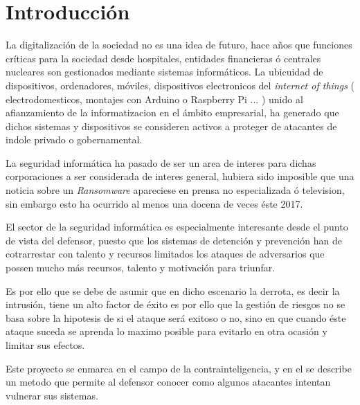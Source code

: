 
\chapter{Introducción}

La digitalización de la sociedad no es una idea de futuro, hace años que funciones críticas para la sociedad
desde hospitales, entidades financieras ó centrales nucleares son gestionados mediante sistemas informáticos. 
La ubicuidad de dispositivos, ordenadores, móviles, dispositivos electronicos del \emph{internet of things}
( electrodomesticos, montajes con Arduino o Raspberry Pi ... ) unido al afianzamiento de la informatizacion en el ámbito empresarial, ha generado
que dichos sistemas y dispositivos se consideren activos a proteger de atacantes de indole privado o gobernamental.

La seguridad informática ha pasado de ser un area de interes para dichas corporaciones a ser considerada de interes general,
hubiera sido imposible que una noticia sobre un \emph{Ransomware} apareciese en prensa no especializada ó television, sin embargo esto ha ocurrido
al menos una docena de veces éste 2017.

El sector de la seguridad informática es especialmente interesante desde el punto de vista del defensor, puesto que
los sistemas de detención y prevención han de cotrarrestar con talento y recursos limitados los ataques de adversarios
que possen mucho más recursos, talento y motivación para triunfar.

Es por ello que se debe de asumir que en dicho escenario la derrota, es decir la intrusión, tiene un alto factor de éxito es 
por ello que la gestión de riesgos no se basa sobre la hipotesis de si el ataque será exitoso o no, sino en que cuando
éste ataque suceda se aprenda lo maximo posible para evitarlo en otra ocasión y limitar sus efectos.

Este proyecto se enmarca en el campo de la contrainteligencia, y en el se describe un metodo que permite al defensor conocer como algunos atacantes intentan vulnerar sus sistemas. 






